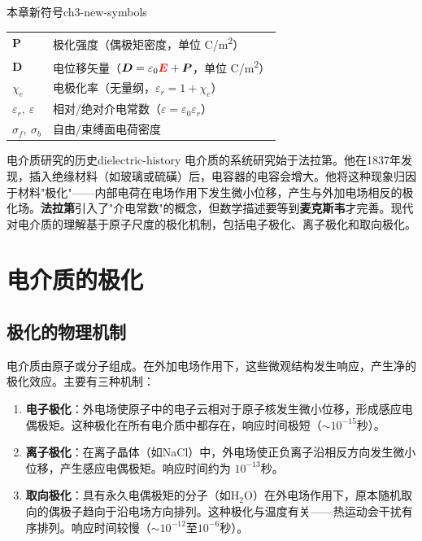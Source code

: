 \documentclass[11pt,a4paper,openany,oneside]{book}
\newcommand{\vecE}{\textcolor{red}{\vect{E}}}
\newcommand{\eps}{\varepsilon}
\newcommand{\vect}[1]{\bm{#1}}
\begin{document}
\begin{tip}{本章新符号}{ch3-new-symbols}
\begin{tabular}{@{}ll@{}}
$\vect{P}$ & 极化强度（偶极矩密度，单位 \si{C/m^2}） \\
$\vect{D}$ & 电位移矢量（$\vect{D} = \eps_0\vecE + \vect{P}$，单位 \si{C/m^2}） \\
$\chi_e$ & 电极化率（无量纲，$\eps_r = 1 + \chi_e$） \\
$\eps_r,\ \eps$ & 相对/绝对介电常数（$\eps = \eps_0\eps_r$） \\
$\sigma_f,\ \sigma_b$ & 自由/束缚面电荷密度 \\
\end{tabular}
\end{tip}

\begin{history}{电介质研究的历史}{dielectric-history}
电介质的系统研究始于法拉第。他在1837年发现，插入绝缘材料（如玻璃或硫磺）后，电容器的电容会增大。他将这种现象归因于材料"极化"——内部电荷在电场作用下发生微小位移，产生与外加电场相反的极化场。\textbf{法拉第}引入了"介电常数"的概念，但数学描述要等到\textbf{麦克斯韦}才完善。现代对电介质的理解基于原子尺度的极化机制，包括电子极化、离子极化和取向极化。
\end{history}

\section{电介质的极化}

\subsection{极化的物理机制}

电介质由原子或分子组成。在外加电场作用下，这些微观结构发生响应，产生净的极化效应。主要有三种机制：

\begin{enumerate}
\item \textbf{电子极化}：外电场使原子中的电子云相对于原子核发生微小位移，形成感应电偶极矩。这种极化在所有电介质中都存在，响应时间极短（$\sim 10^{-15}$秒）。

\item \textbf{离子极化}：在离子晶体（如NaCl）中，外电场使正负离子沿相反方向发生微小位移，产生感应电偶极矩。响应时间约为 $10^{-13}$秒。

\item \textbf{取向极化}：具有永久电偶极矩的分子（如H$_2$O）在外电场作用下，原本随机取向的偶极子趋向于沿电场方向排列。这种极化与温度有关——热运动会干扰有序排列。响应时间较慢（$\sim 10^{-12}$至$10^{-6}$秒）。
\end{enumerate}
\end{document}

